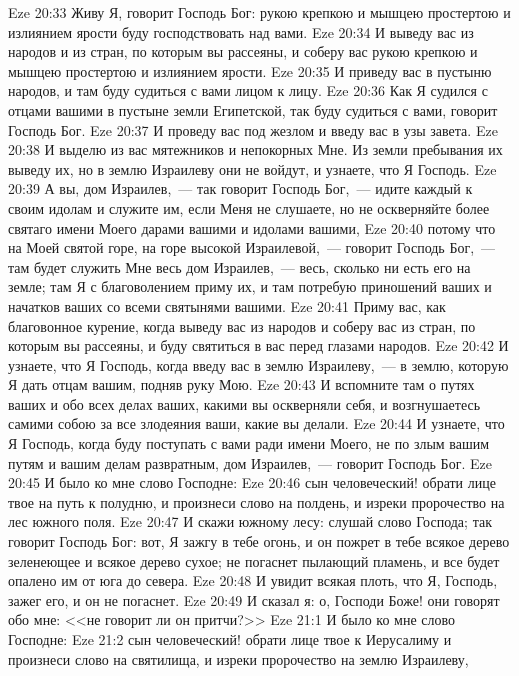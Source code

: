 \vs Eze 20:33 Живу Я, говорит Господь Бог: рукою крепкою и мышцею простертою и излиянием ярости буду господствовать над вами.
\vs Eze 20:34 И выведу вас из народов и из стран, по которым вы рассеяны, и соберу вас рукою крепкою и мышцею простертою и излиянием ярости.
\vs Eze 20:35 И приведу вас в пустыню народов, и там буду судиться с вами лицом к лицу.
\vs Eze 20:36 Как Я судился с отцами вашими в пустыне земли Египетской, так буду судиться с вами, говорит Господь Бог.
\vs Eze 20:37 И проведу вас под жезлом и введу вас в узы завета.
\vs Eze 20:38 И выделю из вас мятежников и непокорных Мне. Из земли пребывания их выведу их, но в землю Израилеву они не войдут, и узнаете, что Я Господь.
\vs Eze 20:39 А вы, дом Израилев,~--- так говорит Господь Бог,~--- идите каждый к своим идолам и служите им, если Меня не слушаете, но не оскверняйте более святаго имени Моего дарами вашими и идолами вашими,
\vs Eze 20:40 потому что на Моей святой горе, на горе высокой Израилевой,~--- говорит Господь Бог,~--- там будет служить Мне весь дом Израилев,~--- весь, сколько ни есть его на земле; там Я с благоволением приму их, и там потребую приношений ваших и начатков ваших со всеми святынями вашими.
\vs Eze 20:41 Приму вас, как благовонное курение, когда выведу вас из народов и соберу вас из стран, по которым вы рассеяны, и буду святиться в вас перед глазами народов.
\vs Eze 20:42 И узнаете, что Я Господь, когда введу вас в землю Израилеву,~--- в землю, которую Я  дать отцам вашим, подняв руку Мою.
\vs Eze 20:43 И вспомните там о путях ваших и обо всех делах ваших, какими вы оскверняли себя, и возгнушаетесь самими собою за все злодеяния ваши, какие вы делали.
\vs Eze 20:44 И узнаете, что Я Господь, когда буду поступать с вами ради имени Моего, не по злым вашим путям и вашим делам развратным, дом Израилев,~--- говорит Господь Бог.
\rsbpar\vs Eze 20:45 И было ко мне слово Господне:
\vs Eze 20:46 сын человеческий! обрати лице твое на путь к полудню, и произнеси слово на полдень, и изреки пророчество на лес южного поля.
\vs Eze 20:47 И скажи южному лесу: слушай слово Господа; так говорит Господь Бог: вот, Я зажгу в тебе огонь, и он пожрет в тебе всякое дерево зеленеющее и всякое дерево сухое; не погаснет пылающий пламень, и все будет опалено им от юга до севера.
\vs Eze 20:48 И увидит всякая плоть, что Я, Господь, зажег его, и он не погаснет.
\vs Eze 20:49 И сказал я: о, Господи Боже! они говорят обо мне: <<не говорит ли он притчи?>>
\vs Eze 21:1 И было ко мне слово Господне:
\vs Eze 21:2 сын человеческий! обрати лице твое к Иерусалиму и произнеси слово на святилища, и изреки пророчество на землю Израилеву,
